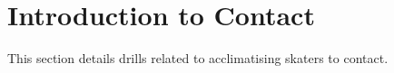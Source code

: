 \chapter{Introduction to Contact}
This section details drills related to acclimatising skaters to contact. 
